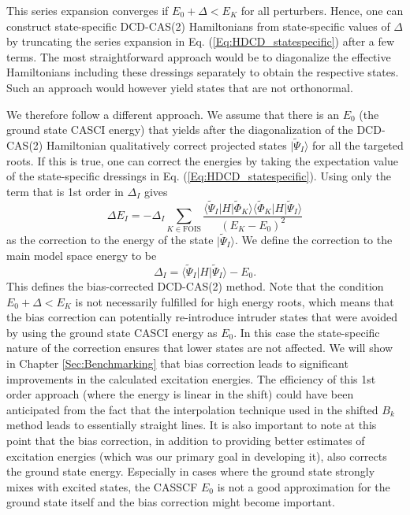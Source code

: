 This series expansion converges if ${E_0} + \Delta  < {E_K}$ for all perturbers. Hence, one can construct state-specific DCD-CAS(2) Hamiltonians from state-specific values of $\Delta$ by truncating the series expansion in Eq. (\ref{Eq:HDCD_statespecific}) after a few terms. The most straightforward approach would be to diagonalize the effective Hamiltonians including these dressings separately to obtain the respective states. Such an approach would however yield states that are not orthonormal.

We therefore follow a different approach. We assume that there is an ${E_0}$ (the ground state CASCI energy) that yields after the diagonalization of the DCD-CAS(2) Hamiltonian qualitatively correct projected states $|{\tilde \Psi _I}\rangle$ for all the targeted roots. If this is true, one can correct the energies by taking the expectation value of the state-specific dressings in Eq. (\ref{Eq:HDCD_statespecific}). 							
Using only the term that is 1st order in $\Delta_I$ gives
\begin{equation}
\label{Eq:biascorr1}
\Delta {E_I} =  - {\Delta _I}\sum\limits_{K \in {\text{FOIS}}} {\frac{{\langle {{\tilde \Psi }_I}|H|{{\tilde \Phi }_K}\rangle \langle {{{\tilde \Phi }_K}|H|{\tilde \Psi }_I}\rangle}}{{{{({E_K} - {E_0})}^2}}}} 
\end{equation}		
as the correction to the energy of the state $|\tilde{\Psi}_I\rangle$. We define the correction to the main model space energy to be
\begin{equation}
{\Delta _I} = \langle {\tilde \Psi _I}|H|{\tilde \Psi _I}\rangle  - {E_0}.
\end{equation}	
This defines the bias-corrected DCD-CAS(2) method. Note that the condition ${E_0} + \Delta  < {E_K}$ is not necessarily fulfilled for high energy roots, which means that the bias correction can potentially re-introduce intruder states that were avoided by using the ground state CASCI energy as $E_0$.
In this case the state-specific nature of the correction ensures that lower states are not affected.		
We will show in Chapter \ref{Sec:Benchmarking} that bias correction leads to significant improvements in the calculated excitation energies. The efficiency of this 1st order approach (where the energy is linear in the shift) could have been anticipated from the fact that the interpolation technique used in the shifted $B_k$ method leads to essentially straight lines.\cite{NitzsD_1978_3103} It is also important to note at this point that the bias correction, in addition to providing better estimates of excitation energies (which was our primary goal in developing it), also corrects the ground state energy. Especially in cases where the ground state strongly mixes with excited states, the CASSCF $E_0$ is not a good approximation for the ground state itself and the bias correction might become important.

